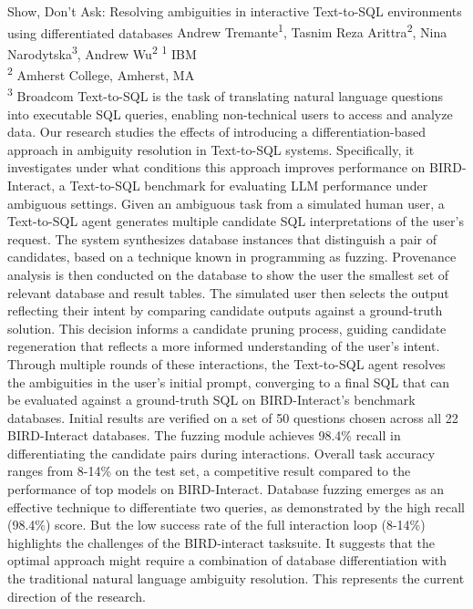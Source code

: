 \makeabstract
    {
    Show, Don{\textquoteright}t Ask: Resolving ambiguities in interactive Text-to-SQL environments using differentiated databases
    }
    {
    Andrew Tremante\textsuperscript{1}, Tasnim Reza Arittra\textsuperscript{2}, Nina Narodytska\textsuperscript{3}, Andrew Wu\textsuperscript{2}
    }
    {
    \textsuperscript{1} IBM\\
\textsuperscript{2} Amherst College, Amherst, MA\\
\textsuperscript{3} Broadcom
    }
    {
    Text-to-SQL is the task of translating natural language questions into executable SQL queries, enabling non-technical users to access and analyze data. Our research studies the effects of introducing a differentiation-based approach in ambiguity resolution in Text-to-SQL systems. Specifically, it investigates under what conditions this approach improves performance on BIRD-Interact, a Text-to-SQL benchmark for evaluating LLM performance under ambiguous settings. 
    }
    {
    Given an ambiguous task from a simulated human user, a Text-to-SQL agent generates multiple candidate SQL interpretations of the user{\textquoteright}s request. The system synthesizes database instances that distinguish a pair of candidates, based on a technique known in programming as fuzzing. Provenance analysis is then conducted on the database to show the user the smallest set of relevant database and result tables. The simulated user then selects the output reflecting their intent by comparing candidate outputs against a ground-truth solution. This decision informs a candidate pruning process, guiding candidate regeneration that reflects a more informed understanding of the user{\textquoteright}s intent. Through multiple rounds of these interactions, the Text-to-SQL agent resolves the ambiguities in the user{\textquoteright}s initial prompt, converging to a final SQL that can be  evaluated against a ground-truth SQL on BIRD-Interact{\textquoteright}s benchmark databases.
    }
    {
    Initial results are verified on a set of 50 questions chosen across all 22 BIRD-Interact databases. The fuzzing module achieves 98.4\% recall in differentiating the candidate pairs during interactions. Overall task accuracy ranges from 8-14\% on the test set, a competitive result compared to the performance of top models on BIRD-Interact.
    }
    {
    Database fuzzing emerges as an effective technique to  differentiate two queries, as demonstrated by the high recall (98.4\%) score. But the low success rate of the full interaction loop (8-14\%) highlights the challenges of the BIRD-interact tasksuite. It suggests that the optimal approach might require a combination of database differentiation with the traditional natural language ambiguity resolution. This represents the current direction of the research. 
    }

    \newpage
    